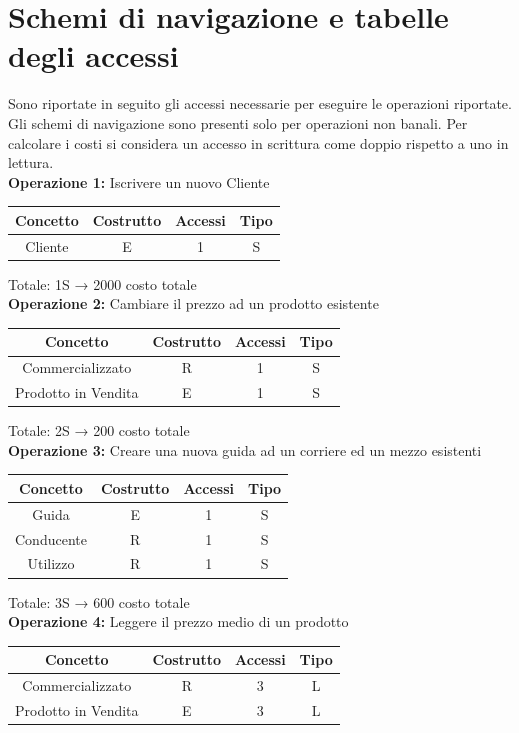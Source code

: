 \documentclass[a4paper,12pt]{report}
\begin{document}
\section{Schemi di navigazione e tabelle degli accessi}
Sono riportate in seguito gli accessi necessarie per eseguire le operazioni riportate. 
Gli schemi di navigazione sono presenti solo per operazioni non banali. Per calcolare i costi si considera un accesso in scrittura come doppio rispetto a uno in lettura.\\
\textbf{Operazione 1:}
Iscrivere un nuovo Cliente
\begin{center}
    \begin{tabular}{ | c   c   c   c | } 
    \hline
    Concetto&Costrutto&Accessi&Tipo\\
	\hline
	Cliente&E&1&S\\
	\hline
	\end{tabular}
\end{center}
Totale: 1S → 2000 costo totale\\
\textbf{Operazione 2:}
Cambiare il prezzo ad un prodotto esistente
\begin{center}
    \begin{tabular}{ | c   c   c   c | } 
    \hline
    Concetto&Costrutto&Accessi&Tipo\\
	\hline
	Commercializzato&R&1&S\\
	\hline
	Prodotto in Vendita&E&1&S\\
	\hline
	\end{tabular}
\end{center}
Totale: 2S → 200 costo totale\\
\textbf{Operazione 3:}
Creare una nuova guida ad un corriere ed un mezzo esistenti
\begin{center}
    \begin{tabular}{ | c   c   c   c | } 	
    \hline
	Concetto&Costrutto&Accessi&Tipo\\
	\hline
	Guida&E&1&S\\
	\hline
	Conducente&R&1&S\\
	\hline
	Utilizzo&R&1&S\\
	\hline
	\end{tabular}
\end{center}
Totale: 3S → 600 costo totale\\
\textbf{Operazione 4:}
Leggere il prezzo medio di un prodotto\\
\begin{center}
    \begin{tabular}{ | c   c   c   c | } 
    \hline
	Concetto&Costrutto&Accessi&Tipo\\
	\hline
	Commercializzato&R&3&L\\
	\hline
    Prodotto in Vendita&E&3&L\\
	\hline
	\end{tabular}
\end{center}
\end{document}
